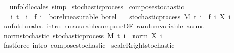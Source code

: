 \begin{isabellebody}
\isadelimproof
\ %
\endisadelimproof
%
\isatagproof
{}\isamarkupfalse%
\ {\isacharparenleft}{\kern0pt}unfold{\isacharunderscore}{\kern0pt}locales{\isacharparenright}{\kern0pt}\ simp%
\endisatagproof
{\isafoldproof}%
%
\isadelimproof
%
\endisadelimproof
\isanewline
\isanewline
{}\isamarkupfalse%
\ stochastic{\isacharunderscore}{\kern0pt}process\isanewline
{}\isanewline
\isanewline
{}\isamarkupfalse%
\ compose{\isacharunderscore}{\kern0pt}stochastic{\isacharcolon}{\kern0pt}\isanewline
\ \ \ {\isachardoublequoteopen}{\isasymAnd}i{\isachardot}{\kern0pt}\ t\ {\isasymle}\ i\ {\isasymLongrightarrow}\ f\ i\ {\isasymin}\ borel{\isacharunderscore}{\kern0pt}measurable\ borel{\isachardoublequoteclose}\isanewline
\ \ \ {\isachardoublequoteopen}stochastic{\isacharunderscore}{\kern0pt}process\ M\ t\ {\isacharparenleft}{\kern0pt}{\isasymlambda}i\ {\isasymxi}{\isachardot}{\kern0pt}\ {\isacharparenleft}{\kern0pt}f\ i{\isacharparenright}{\kern0pt}\ {\isacharparenleft}{\kern0pt}X\ i\ {\isasymxi}{\isacharparenright}{\kern0pt}{\isacharparenright}{\kern0pt}{\isachardoublequoteclose}\isanewline
%
\isadelimproof
\ \ %
\endisadelimproof
%
\isatagproof
{}\isamarkupfalse%
\ {\isacharparenleft}{\kern0pt}unfold{\isacharunderscore}{\kern0pt}locales{\isacharparenright}{\kern0pt}\ {\isacharparenleft}{\kern0pt}intro\ measurable{\isacharunderscore}{\kern0pt}compose{\isacharbrackleft}{\kern0pt}OF\ random{\isacharunderscore}{\kern0pt}variable\ assms{\isacharbrackright}{\kern0pt}{\isacharparenright}{\kern0pt}%
\endisatagproof
{\isafoldproof}%
%
\isadelimproof
\ \isanewline
%
\endisadelimproof
\isanewline
{}\isamarkupfalse%
\ norm{\isacharunderscore}{\kern0pt}stochastic{\isacharcolon}{\kern0pt}\ {\isachardoublequoteopen}stochastic{\isacharunderscore}{\kern0pt}process\ M\ t\ {\isacharparenleft}{\kern0pt}{\isasymlambda}i\ {\isasymxi}{\isachardot}{\kern0pt}\ norm\ {\isacharparenleft}{\kern0pt}X\ i\ {\isasymxi}{\isacharparenright}{\kern0pt}{\isacharparenright}{\kern0pt}{\isachardoublequoteclose}%
\isadelimproof
\ %
\endisadelimproof
%
\isatagproof
{}\isamarkupfalse%
\ {\isacharparenleft}{\kern0pt}fastforce\ intro{\isacharcolon}{\kern0pt}\ compose{\isacharunderscore}{\kern0pt}stochastic{\isacharparenright}{\kern0pt}%
\endisatagproof
{\isafoldproof}%
%
\isadelimproof
%
\endisadelimproof
\isanewline
\isanewline
{}\isamarkupfalse%
\ scaleR{\isacharunderscore}{\kern0pt}right{\isacharunderscore}{\kern0pt}stochastic{\isacharcolon}{\kern0pt}\isanewline

\end{isabellebody}
